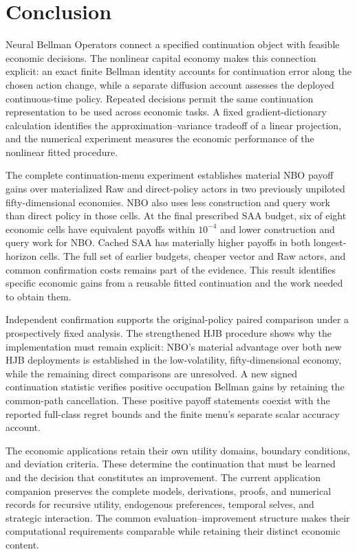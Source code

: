 \section{Conclusion}\label{sec:conclusion}
Neural Bellman Operators connect a specified continuation object with feasible
economic decisions. The nonlinear capital economy makes this connection
explicit: an exact finite Bellman identity accounts for continuation error
along the chosen action change, while a separate diffusion account assesses
the deployed continuous-time policy. Repeated decisions permit the same
continuation representation to be used across economic tasks. A fixed
gradient-dictionary calculation identifies the approximation--variance
tradeoff of a linear projection, and the numerical experiment measures the
economic performance of the nonlinear fitted procedure.

The complete continuation-menu experiment establishes material NBO payoff
gains over materialized Raw and direct-policy actors in two previously
unpiloted fifty-dimensional economies. NBO also uses less construction and
query work than direct policy in those cells. At the final prescribed SAA
budget, six of eight economic cells have equivalent payoffs within
$10^{-4}$ and lower construction and query work for NBO. Cached SAA has
materially higher payoffs in both longest-horizon cells. The full set of
earlier budgets, cheaper vector and Raw actors, and common confirmation
costs remains part of the evidence. This result identifies specific
economic gains from a reusable fitted continuation and the work needed
to obtain them.

Independent confirmation supports the original-policy paired comparison
under a prospectively fixed analysis. The strengthened HJB procedure shows
why the implementation must remain explicit: NBO's material advantage
over both new HJB deployments is established in the low-volatility,
fifty-dimensional economy, while the remaining direct comparisons are
unresolved. A new signed continuation statistic verifies positive
occupation Bellman gains by retaining the common-path cancellation.
These positive payoff statements coexist with the reported full-class
regret bounds and the finite menu's separate scalar accuracy account.

The economic applications retain their own utility domains, boundary
conditions, and deviation criteria. These determine the continuation
that must be learned and the decision that constitutes an improvement.
The current application companion preserves the complete models,
derivations, proofs, and numerical records for recursive utility,
endogenous preferences, temporal selves, and strategic interaction.
The common evaluation--improvement structure makes their computational
requirements comparable while retaining their distinct economic content.

